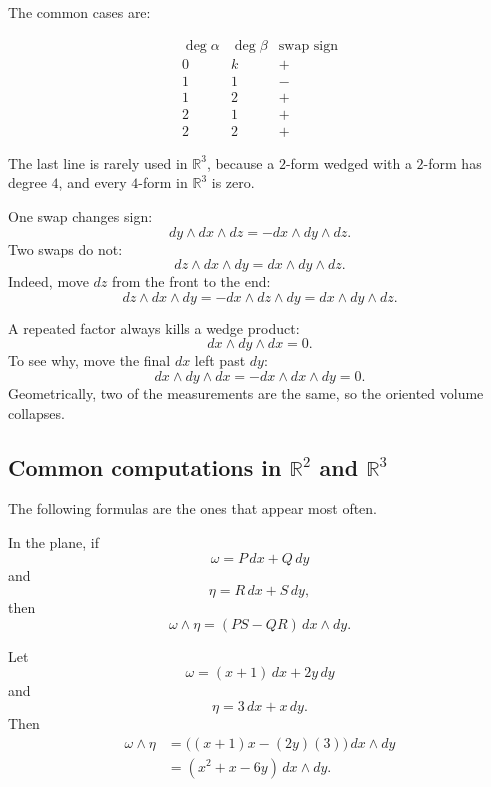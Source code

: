 The common cases are:

\[
\begin{array}{c|c|c}
\deg\alpha & \deg\beta & \text{swap sign} \\ \hline
0 & k & +\\[1mm]
1 & 1 & -\\[1mm]
1 & 2 & +\\[1mm]
2 & 1 & +\\[1mm]
2 & 2 & +
\end{array}
\]

The last line is rarely used in \(\mathbb R^3\), because a \(2\)-form wedged with a
\(2\)-form has degree \(4\), and every \(4\)-form in \(\mathbb R^3\) is zero.

\begin{example}
One swap changes sign:
\[
    dy\wedge dx\wedge dz
    =
    -dx\wedge dy\wedge dz.
\]
Two swaps do not:
\[
    dz\wedge dx\wedge dy
    =
    dx\wedge dy\wedge dz.
\]
Indeed, move \(dz\) from the front to the end:
\[
    dz\wedge dx\wedge dy
    =
    -dx\wedge dz\wedge dy
    =
    dx\wedge dy\wedge dz.
\]
\end{example}

A repeated factor always kills a wedge product:
\[
    dx\wedge dy\wedge dx=0.
\]
To see why, move the final \(dx\) left past \(dy\):
\[
    dx\wedge dy\wedge dx
    =
    -dx\wedge dx\wedge dy
    =
    0.
\]
Geometrically, two of the measurements are the same, so the oriented volume collapses.

\subsection{Common computations in \texorpdfstring{\(\mathbb R^2\)}{R2} and
\texorpdfstring{\(\mathbb R^3\)}{R3}}

The following formulas are the ones that appear most often.

In the plane, if
\[
    \omega=P\,dx+Q\,dy
\]
and
\[
    \eta=R\,dx+S\,dy,
\]
then
\[
\boxed{
    \omega\wedge\eta
    =
    (PS-QR)\,dx\wedge dy.
}
\]

\begin{example}
Let
\[
    \omega=(x+1)\,dx+2y\,dy
\]
and
\[
    \eta=3\,dx+x\,dy.
\]
Then
\[
\begin{aligned}
    \omega\wedge\eta
    &=
    \bigl((x+1)x-(2y)(3)\bigr)\,dx\wedge dy\\
    &=
    (x^2+x-6y)\,dx\wedge dy.
\end{aligned}
\]
\end{example}

